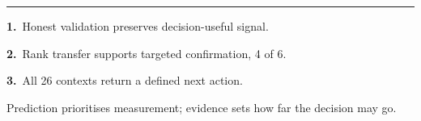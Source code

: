 \documentclass[
	landscape,   %
	a1papersize, %
	print,       %
]{ImperialPoster}
\newcommand{\bodyfont}{\fontsize{22pt}{25pt}\selectfont}
\begin{document}
\begin{minipage}[t]{59.4cm}
\begin{minipage}[t]{24.6cm}
		\vspace{1.6mm}
		{\color{RuleGrey}\rule{\linewidth}{1.5pt}}\par
		\vspace{1.2mm}

		{\bodyfont
		\textbf{1.}~Honest validation preserves decision-useful signal.\par\vspace{0.8mm}
		\textbf{2.}~Rank transfer supports targeted confirmation, 4 of 6.\par\vspace{0.8mm}
		\textbf{3.}~All 26 contexts return a defined next action.\par}

		\vspace{1.8mm}
		{\ImperialSansSemiBold\fontsize{20pt}{23pt}\selectfont\color{ICLBlue}Prediction prioritises measurement; evidence sets how far the decision may go.\par}
	\end{minipage}

\end{minipage}
\end{document}

